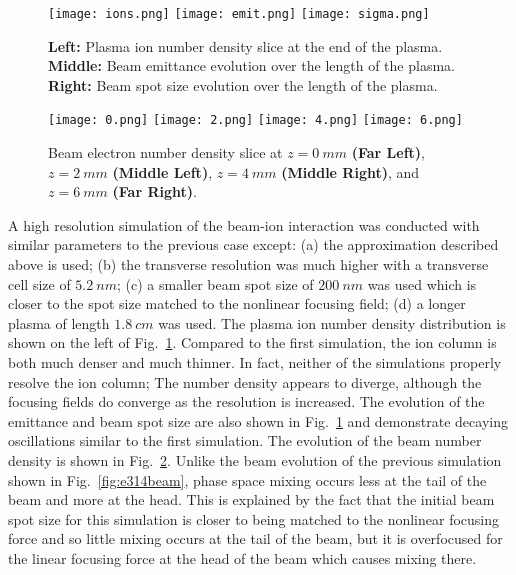 \documentclass{aac}
\begin{document}
\begin{figure}[h]
    \centering
    \texttt{[image: ions.png]}
    \texttt{[image: emit.png]}
    \texttt{[image: sigma.png]}
    \centering
    \caption{\textbf{Left:} Plasma ion number density slice at the end of the plasma. \textbf{Middle:} Beam emittance evolution over the length of the plasma. \textbf{Right:} Beam spot size evolution over the length of the plasma.}
    \label{fig:other}
\end{figure}

\begin{figure}[h]
    \centering
    \texttt{[image: 0.png]}
    \texttt{[image: 2.png]}
    \texttt{[image: 4.png]}
    \texttt{[image: 6.png]}
    \centering
    \caption{Beam electron number density slice at $z = \SI{0}{mm}$ \textbf{(Far Left)}, $z = \SI{2}{mm}$ \textbf{(Middle Left)}, $z = \SI{4}{mm}$ \textbf{(Middle Right)}, and $z = \SI{6}{mm}$ \textbf{(Far Right)}.}
    \label{fig:beam}
\end{figure}

A high resolution simulation of the beam-ion interaction was conducted with similar parameters to the previous case except: (a) the approximation described above is used; (b) the transverse resolution was much higher with a transverse cell size of $\SI{5.2}{nm}$; (c) a smaller beam spot size of $\SI{200}{nm}$ was used which is closer to the spot size matched to the nonlinear focusing field; (d) a longer plasma of length $\SI{1.8}{cm}$ was used. The plasma ion number density distribution is shown on the left of Fig.~\ref{fig:other}. Compared to the first simulation, the ion column is both much denser and much thinner. In fact, neither of the simulations properly resolve the ion column; The number density appears to diverge, although the focusing fields do converge as the resolution is increased. The evolution of the emittance and beam spot size are also shown in Fig.~\ref{fig:other} and demonstrate decaying oscillations similar to the first simulation. The evolution of the beam number density is shown in Fig.~\ref{fig:beam}. Unlike the beam evolution of the previous simulation shown in Fig.~\ref{fig:e314beam}, phase space mixing occurs less at the tail of the beam and more at the head. This is explained by the fact that the initial beam spot size for this simulation is closer to being matched to the nonlinear focusing force and so little mixing occurs at the tail of the beam, but it is overfocused for the linear focusing force at the head of the beam which causes mixing there.
\end{document}
